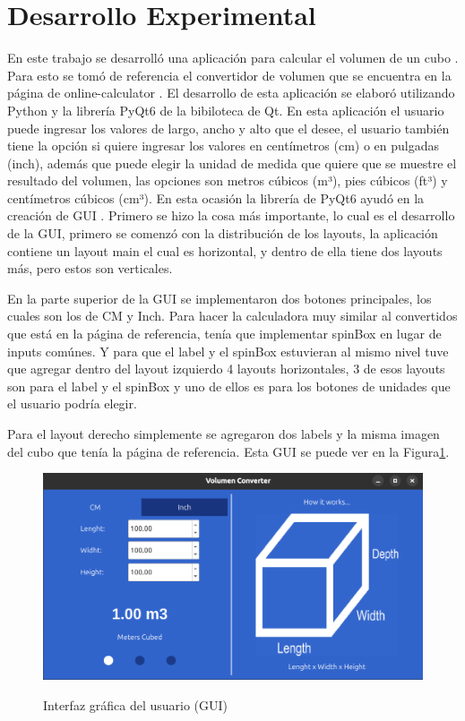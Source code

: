 \documentclass[conference]{IEEEtran}
\begin{document}
\section{Desarrollo Experimental}

En este trabajo se desarrolló una aplicación para calcular el volumen de un cubo \cite{Omni2025}. Para esto se tomó de referencia el convertidor de volumen que se encuentra en la página de online-calculator \cite{volumeConverter}. El desarrollo de esta aplicación se elaboró utilizando Python \cite{qtforpython} y la librería PyQt6 de la bibiloteca de Qt. En esta aplicación el usuario puede ingresar los valores de largo, ancho y alto que el desee, el usuario también tiene la opción si quiere ingresar los valores en centímetros (cm) o en pulgadas (inch), además que puede elegir la unidad de medida que quiere que se muestre el resultado del volumen, las opciones son metros cúbicos (m³), pies cúbicos (ft³) y centímetros cúbicos (cm³). En esta ocasión la librería de PyQt6 \cite{DELAOSSAALIAN2025101497} ayudó en la creación de GUI \cite{5725235}. Primero se hizo la cosa más importante, lo cual es el desarrollo de la GUI, primero se comenzó con la distribución de los layouts, la aplicación contiene un layout main el cual es horizontal, y dentro de ella tiene dos layouts más, pero estos son verticales.

En la parte superior de la GUI se implementaron dos botones principales, los cuales son los de CM y Inch. Para hacer la calculadora muy similar al convertidos que está en la página de referencia, tenía que implementar spinBox \cite{qspinbox} en lugar de inputs comúnes. Y para que el label y el spinBox estuvieran al mismo nivel tuve que agregar dentro del layout izquierdo 4 layouts horizontales, 3 de esos layouts son para el label y el spinBox y uno de ellos es para los botones de unidades que el usuario podría elegir.

Para el layout derecho simplemente se agregaron dos labels y la misma imagen del cubo que tenía la página de referencia. Esta GUI se puede ver en la Figura\ref{fig:figura1}.

%
%
% 
\begin{figure}
{\includegraphics*[width=\breite\columnwidth]{GUI.png}}
\caption{Interfaz gráfica del usuario (GUI)}
\label{fig:figura1}
\end{figure}
\end{document}
